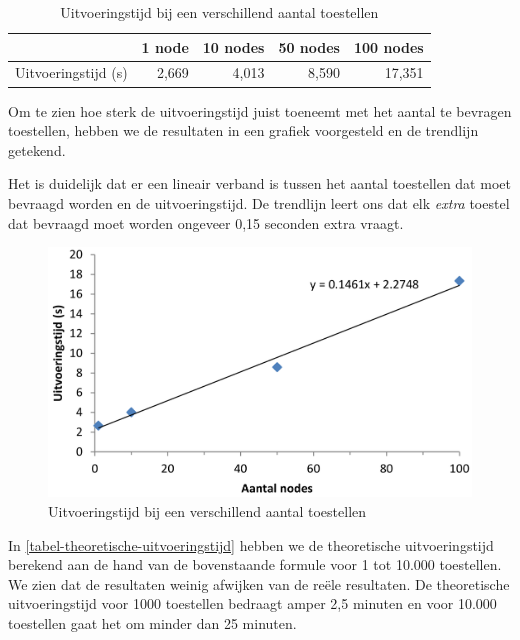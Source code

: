 \begin{table}[h]
\centering
\begin{tabular}{@{}lrrrr@{}}
\toprule
                    & 1 node & 10 nodes & 50 nodes & 100 nodes \\ \midrule
Uitvoeringstijd (s) & 2,669  & 4,013    & 8,590    & 17,351    \\ \bottomrule
\end{tabular}
\caption{Uitvoeringstijd bij een verschillend aantal toestellen}
\label{tabel-uitvoeringstijd-aantalnodes}
\end{table}

Om te zien hoe sterk de uitvoeringstijd juist toeneemt met het aantal te bevragen toestellen,
hebben we de resultaten in een grafiek voorgesteld en de trendlijn getekend.

Het is duidelijk dat er een lineair verband is tussen het aantal toestellen dat moet bevraagd worden en de uitvoeringstijd.
De trendlijn leert ons dat elk \textit{extra} toestel dat bevraagd moet worden ongeveer 0,15 seconden extra vraagt.

\begin{figure}[h]
	\centering
	\includegraphics[scale=0.40]{figures/uitvoeringstijd}
	\caption{Uitvoeringstijd bij een verschillend aantal toestellen}
	\label{fig-uitvoeringstijd}
\end{figure}

In \cref{tabel-theoretische-uitvoeringstijd} hebben we de theoretische uitvoeringstijd berekend aan de hand van de bovenstaande formule voor 1 tot 10.000 toestellen.
We zien dat de resultaten weinig afwijken van de reële resultaten.
De theoretische uitvoeringstijd voor 1000 toestellen bedraagt amper 2,5 minuten en voor 10.000 toestellen gaat het om minder dan 25 minuten.

